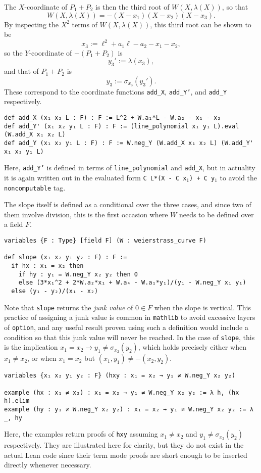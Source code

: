 \documentclass[a4paper,UKenglish,cleveref,autoref,thm-restate]{lipics-v2021}
\begin{document}
The $ X $-coordinate of $ P_1 + P_2 $ is then the third root of $ W(X, \lambda(X)) $, so that
\begin{equation}
\label{eq:1}
W(X, \lambda(X)) = -(X - x_1)(X - x_2)(X - x_3).
\end{equation}
By inspecting the $ X^2 $ terms of $ W(X, \lambda(X)) $, this third root can be shown to be
\[ x_3 := \ell^2 + a_1\ell - a_2 - x_1 - x_2, \]
so the $ Y $-coordinate of $ -(P_1 + P_2) $ is
\[ y_3' := \lambda(x_3), \]
and that of $ P_1 + P_2 $ is
\[ y_3 := \sigma_{x_3}(y_3'). \]
These correspond to the coordinate functions \texttt{add\_X}, \texttt{add\_Y'}, and \texttt{add\_Y} respectively.
\begin{lstlisting}
def add_X (x₁ x₂ L : F) : F := L^2 + W.a₁*L - W.a₂ - x₁ - x₂
def add_Y' (x₁ x₂ y₁ L : F) : F := (line_polynomial x₁ y₁ L).eval (W.add_X x₁ x₂ L)
def add_Y (x₁ x₂ y₁ L : F) : F := W.neg_Y (W.add_X x₁ x₂ L) (W.add_Y' x₁ x₂ y₁ L)
\end{lstlisting}
Here, \texttt{add\_Y'} is defined in terms of \texttt{line\_polynomial} and \texttt{add\_X}, but in actuality it is again written out in the evaluated form \texttt{C L*(X - C x\ensuremath{_1}) + C y\ensuremath{_1}} to avoid the \texttt{noncomputable} tag.

\pagebreak

The slope itself is defined as a conditional over the three cases, and since two of them involve division, this is the first occasion where $ W $ needs to be defined over a field $ F $.
\begin{lstlisting}
variables {F : Type} [field F] (W : weierstrass_curve F)

def slope (x₁ x₂ y₁ y₂ : F) : F :=
  if hx : x₁ = x₂ then
    if hy : y₁ = W.neg_Y x₂ y₂ then 0
    else (3*x₁^2 + 2*W.a₂*x₁ + W.a₄ - W.a₁*y₁)/(y₁ - W.neg_Y x₁ y₁)
  else (y₁ - y₂)/(x₁ - x₂)
\end{lstlisting}
Note that \texttt{slope} returns the \emph{junk value} of $ 0 \in F $ when the slope is vertical. This practice of assigning a junk value is common in \texttt{mathlib} to avoid excessive layers of \texttt{option}, and any useful result proven using such a definition would include a condition so that this junk value will never be reached. In the case of \texttt{slope}, this is the implication $ x_1 = x_2 \to y_1 \ne \sigma_{x_2}(y_2) $, which holds precisely either when $ x_1 \ne x_2 $, or when $ x_1 = x_2 $ but $ (x_1, y_1) \ne -(x_2, y_2) $.
\begin{lstlisting}
variables {x₁ x₂ y₁ y₂ : F} (hxy : x₁ = x₂ → y₁ ≠ W.neg_Y x₂ y₂)

example (hx : x₁ ≠ x₂) : x₁ = x₂ → y₁ ≠ W.neg_Y x₂ y₂ := λ h, (hx h).elim
example (hy : y₁ ≠ W.neg_Y x₂ y₂) : x₁ = x₂ → y₁ ≠ W.neg_Y x₂ y₂ := λ _, hy
\end{lstlisting}
Here, the examples return proofs of \texttt{hxy} assuming $ x_1 \ne x_2 $ and $ y_1 \ne \sigma_{x_2}(y_2) $ respectively. They are illustrated here for clarity, but they do not exist in the actual Lean code since their term mode proofs are short enough to be inserted directly whenever necessary.
\end{document}
